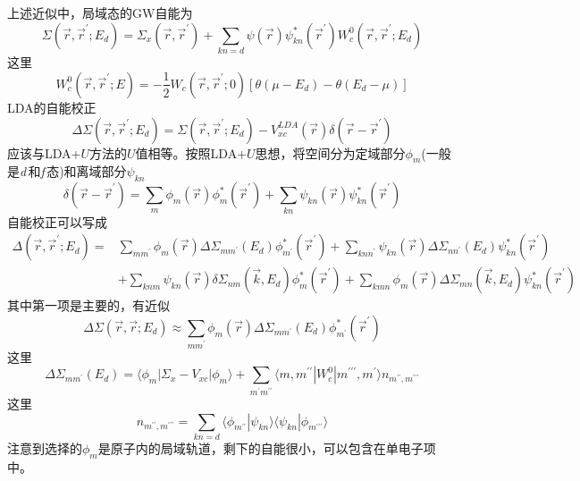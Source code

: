 上述近似中，局域态的GW自能为
\begin{equation}
  \Sigma(\vec r,\vec r^{\prime};E_d)=\Sigma_x(\vec r,\vec r^{\prime})+\sum_{kn=d}\psi(\vec r)\psi_{kn}^{\ast}(\vec r^{\prime})W_c^0(\vec r,\vec r^{\prime};E_d)
  \label{eq:solid-242}
\end{equation}
这里$$W_c^0(\vec r,\vec r^{\prime};E)=-\frac12W_c(\vec r,\vec r^{\prime};0)[\theta(\mu-E_d)-\theta(E_d-\mu)]$$
LDA的自能校正
\begin{equation}
  \Delta\Sigma(\vec r,\vec r^{\prime};E_d)=\Sigma(\vec r,\vec r^{\prime};E_d)-V_{xc}^{LDA}(\vec r)\delta(\vec r-\vec r^{\prime})
  \label{eq:solid-243}
\end{equation}
应该与LDA+$U$方法的$U$值相等。按照LDA+$U$思想，将空间分为定域部分$\phi_m$(一般是{\textit d}\,和{\textit f}\,态)和离域部分$\psi_{kn}$
$$\delta(\vec r-\vec r^{\prime})=\sum_m\phi_m(\vec r)\phi_m^{\ast}(\vec r^{\prime})+\sum_{kn}\psi_{kn}(\vec r)\psi_{kn}^{\ast}(\vec r^{\prime})$$
自能校正可以写成
\begin{equation}
  \begin{split}
    \Delta(\vec r,\vec r^{\prime};E_d)=&\sum_{mm^{\prime}}\phi_m(\vec r)\Delta\Sigma_{mm^{\prime}}(E_d)\phi_{m^{\prime}}^{\ast}(\vec r^{\prime})+\sum_{knn^{\prime}}\psi_{kn}(\vec r)\Delta\Sigma_{nn^{\prime}}(E_d)\psi_{kn}^{\ast}(\vec r^{\prime})\\
    &+\sum_{knm}\psi_{kn}(\vec r)\delta\Sigma_{nm}(\vec k,E_d)\phi_m^{\ast}(\vec r^{\prime})+\sum_{kmn}\phi_m(\vec r)\Delta\Sigma_{mn}(\vec k,E_d)\psi_{kn}^{\ast}(\vec r^{\prime})
  \end{split}
  \label{eq:solid-244}
\end{equation}
其中第一项是主要的，有近似
$$\Delta\Sigma(\vec r,\vec r;E_d)\approx\sum_{mm^{\prime}}\phi_m(\vec r)\Delta\Sigma_{mm^{\prime}}(E_d)\phi_{m^{\prime}}^{\ast}(\vec r^{\prime})$$
这里$$\Delta\Sigma_{mm^{\prime}}(E_d)=\langle\phi_m|\Sigma_x-V_{xc}|\phi_m\rangle+\sum_{m^{\prime}m^{\prime\prime}}\langle m,m^{\prime\prime}|W_c^0|m^{\prime\prime\prime},m^{\prime}\rangle n_{m^{\prime\prime},m^{\prime\prime\prime}}$$
这里$$n_{m^{\prime\prime},m^{\prime\prime\prime}}=\sum_{kn=d}\langle\phi_{m^{\prime\prime}}|\psi_{kn}\rangle\langle\psi_{kn}|\phi_{m^{\prime\prime\prime}}\rangle$$
注意到选择的$\phi_m$是原子内的局域轨道，剩下的自能很小，可以包含在单电子项中。

